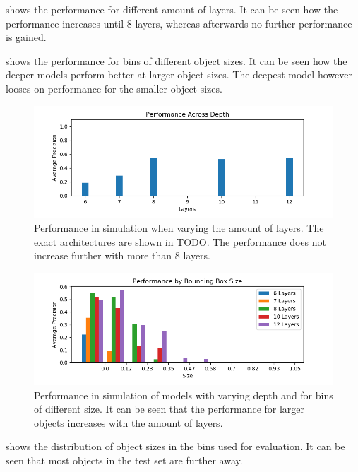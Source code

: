 	 shows the performance for different amount of layers. It can be seen how the performance increases until 8 layers, whereas afterwards no further performance is gained.
	
	 shows the performance for bins of different object sizes. It can be seen how the deeper models perform better at larger object sizes. The deepest model however looses on performance for the smaller object sizes.

	\begin{figure}
		\includegraphics[width=\textwidth]{fig/perf_depth}
		\caption{Performance in simulation when varying the amount of layers. The exact architectures are shown in TODO. The performance does not increase further with more than 8 layers.}
		\label{fig:perf_depth}
	\end{figure}


	\begin{figure}
		\includegraphics[width=\textwidth]{fig/depth_ap_size}
		\caption{Performance in simulation of models with varying depth and for bins of different size. It can be seen that the performance for larger objects increases with the amount of layers.}
		\label{fig:depth_ap_size}
	\end{figure}
	
	 shows the distribution of object sizes in the bins used for evaluation. It can be seen that most objects in the test set are further away.
	

